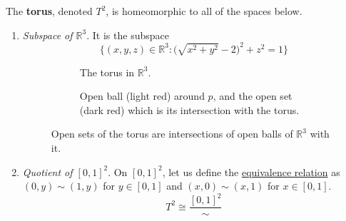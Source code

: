 	\begin{definition}
	  \label{def:constructions-of-the-torus}
	  The \textbf{torus}, denoted $T^2$, is homeomorphic to all of the spaces below. 
		\begin{enumerate}
			\item \textit{Subspace of $\mathbb{R}^3$}. It is the subspace 
				\begin{equation}
					\{(x, y, z) \in \mathbb{R}^3 \colon \big( \sqrt{x^2 + y^2} - 2 \big)^2 + z^2 = 1 \}
				\end{equation}

				\begin{figure}[H]
					\centering
					\begin{subfigure}[t]{0.48\textwidth}
						\centering
						\caption{The torus in $\mathbb{R}^3$.}
						\label{fig:tor_r3_a}
					\end{subfigure}
					\hfill
					\begin{subfigure}[t]{0.48\textwidth}
						\centering
						\caption{Open ball (light red) around $p$, and the open set (dark red) which is its intersection with the torus.}
						\label{fig:tor_r3_b}
					\end{subfigure}
					\caption{Open sets of the torus are intersections of open balls of $\mathbb{R}^3$ with it.}
					\label{fig:tor_r3}
				\end{figure}

			\item \textit{Quotient of $[0, 1]^2$}. On $[0, 1]^2$, let us define the \hyperref[st-def:equivalence_relation]{equivalence relation} as $(0, y) \sim (1, y)$ for $y \in [0, 1]$ and $(x, 0) \sim (x, 1)$ for $x \in [0, 1]$. 
				\begin{equation}
					T^2 \cong \frac{[0, 1]^2}{\sim}
				\end{equation}


\end{enumerate}
\end{definition}
